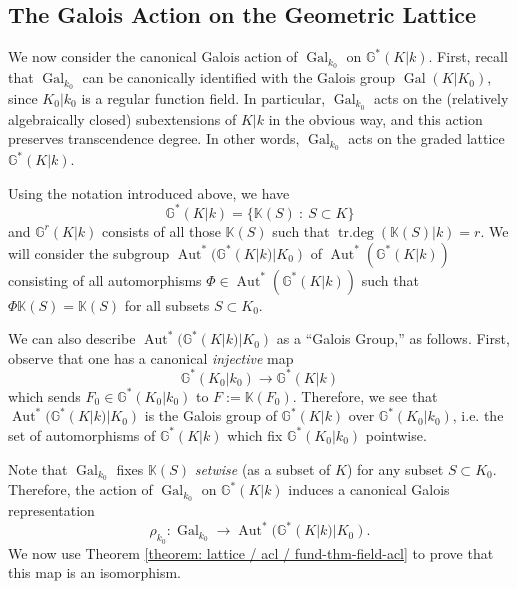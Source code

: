 \documentclass[11pt]{amsart}
\theoremstyle{definition}
\theoremstyle{remark}
\numberwithin{equation}{section}
\DeclareMathOperator{\Aut}{Aut}
\DeclareMathOperator{\Gal}{Gal}
\DeclareMathOperator{\trdeg}{tr.deg}
\newcommand{\G}{\mathbb{G}}
\newcommand{\Gbb}{\mathbb{G}}
\newcommand{\Kbb}{\mathbb{K}}
\newcommand{\Galk}{{\Gal_{k_0}}}
\begin{document}
\subsection{The Galois Action on the Geometric Lattice}
\label{subsection: lattice / galois-acl}

We now consider the canonical Galois action of $\Galk$ on $\G^*(K|k)$.
First, recall that $\Galk$ can be canonically identified with the Galois group $\Gal(K|K_0)$, since $K_0|k_0$ is a regular function field.
In particular, $\Galk$ acts on the (relatively algebraically closed) subextensions of $K|k$ in the obvious way, and this action preserves transcendence degree.
In other words, $\Galk$ acts on the graded lattice $\Gbb^*(K|k)$.

Using the notation introduced above, we have
\[ \G^*(K|k) = \{\Kbb(S) \ : \ S \subset K \} \]
and $\G^r(K|k)$ consists of all those $\Kbb(S)$ such that $\trdeg(\Kbb(S)|k) = r$.
We will consider the subgroup $\Aut^*(\G^*(K|k)|K_0)$ of $\Aut^*(\G^*(K|k))$ consisting of all automorphisms $\Phi \in \Aut^*(\G^*(K|k))$ such that $\Phi \Kbb(S) = \Kbb(S)$ for all subsets $S \subset K_0$.

We can also describe $\Aut^*(\Gbb^*(K|k)|K_0)$ as a ``Galois Group,'' as follows.
First, observe that one has a canonical \emph{injective} map 
\[ \G^*(K_0|k_0) \rightarrow \G^*(K|k) \]
which sends $F_0 \in \G^*(K_0|k_0)$ to $F := \Kbb(F_0)$.
Therefore, we see that $\Aut^*(\G^*(K|k)|K_0)$ is the Galois group of $\G^*(K|k)$ over $\G^*(K_0|k_0)$, i.e. the set of automorphisms of $\G^*(K|k)$ which fix $\G^*(K_0|k_0)$ pointwise.

Note that $\Galk$ fixes $\Kbb(S)$ \emph{setwise} (as a subset of $K$) for any subset $S \subset K_0$.
Therefore, the action of $\Galk$ on $\Gbb^*(K|k)$ induces a canonical Galois representation 
\[ \rho_{k_0} : \Galk \rightarrow \Aut^*(\G^*(K|k)|K_0). \]
We now use Theorem \ref{theorem: lattice / acl / fund-thm-field-acl} to prove that this map is an isomorphism.
\end{document}
